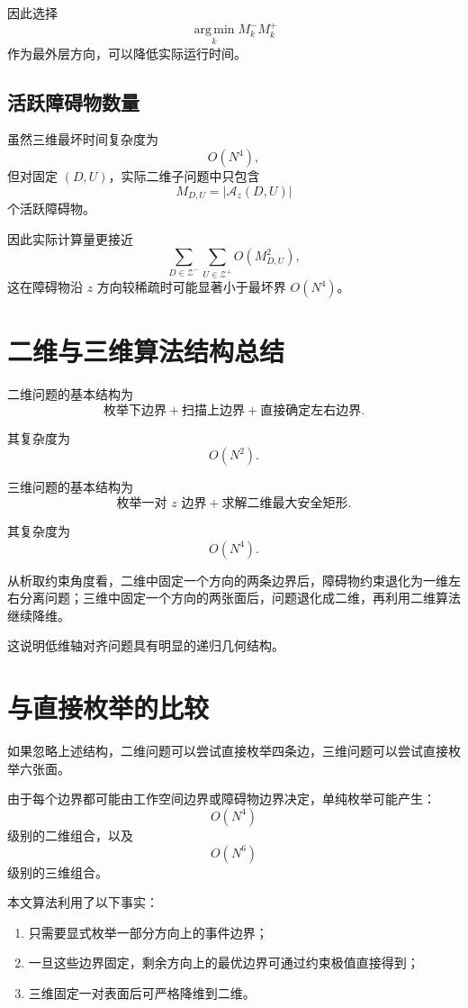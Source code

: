 \documentclass[UTF8,12pt,a4paper]{ctexart}
\newcommand{\argmin}{\operatorname*{arg\,min}}
\begin{document}
因此选择
\[
\argmin_k M_k^-M_k^+
\]
作为最外层方向，可以降低实际运行时间。

\subsection{活跃障碍物数量}

虽然三维最坏时间复杂度为
\[
O(N^4),
\]
但对固定 $(D,U)$，实际二维子问题中只包含
\[
M_{D,U}
=
|\mathcal A_z(D,U)|
\]
个活跃障碍物。

因此实际计算量更接近
\begin{equation}
    \sum_{D\in\mathcal Z^-}
    \sum_{U\in\mathcal Z^+}
    O(M_{D,U}^2),
\end{equation}
这在障碍物沿 $z$ 方向较稀疏时可能显著小于最坏界 $O(N^4)$。

\section{二维与三维算法结构总结}

二维问题的基本结构为
\[
\boxed{
\text{枚举下边界}
+
\text{扫描上边界}
+
\text{直接确定左右边界}.
}
\]

其复杂度为
\[
\boxed{
O(N^2).
}
\]

三维问题的基本结构为
\[
\boxed{
\text{枚举一对 }z\text{ 边界}
+
\text{求解二维最大安全矩形}.
}
\]

其复杂度为
\[
\boxed{
O(N^4).
}
\]

从析取约束角度看，二维中固定一个方向的两条边界后，障碍物约束退化为一维左右分离问题；三维中固定一个方向的两张面后，问题退化成二维，再利用二维算法继续降维。

这说明低维轴对齐问题具有明显的递归几何结构。

\section{与直接枚举的比较}

如果忽略上述结构，二维问题可以尝试直接枚举四条边，三维问题可以尝试直接枚举六张面。

由于每个边界都可能由工作空间边界或障碍物边界决定，单纯枚举可能产生：
\[
O(N^4)
\]
级别的二维组合，以及
\[
O(N^6)
\]
级别的三维组合。

本文算法利用了以下事实：
\begin{enumerate}[label=(\arabic*)]
    \item 只需要显式枚举一部分方向上的事件边界；
    \item 一旦这些边界固定，剩余方向上的最优边界可通过约束极值直接得到；
    \item 三维固定一对表面后可严格降维到二维。
\end{enumerate}
\end{document}
